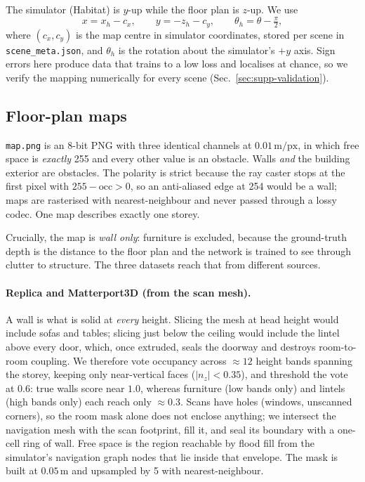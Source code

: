 The simulator (Habitat) is $y$-up while the floor plan is $z$-up. We use
\begin{equation}
  x = x_{h} - c_x, \qquad y = -z_{h} - c_y, \qquad \theta_{h} = \theta - \tfrac{\pi}{2},
\end{equation}
where $(c_x, c_y)$ is the map centre in simulator coordinates, stored per scene in
\texttt{scene\_meta.json}, and $\theta_h$ is the rotation about the simulator's
$+y$ axis. Sign errors here produce data that trains to a low loss and localises
at chance, so we verify the mapping numerically for every scene
(Sec.~\ref{sec:supp-validation}).

\subsection{Floor-plan maps}
\label{sec:supp-maps}

\texttt{map.png} is an 8-bit PNG with three identical channels at
$0.01\,\mathrm{m/px}$, in which free space is \emph{exactly} 255 and every other
value is an obstacle. Walls \emph{and} the building exterior are obstacles. The
polarity is strict because the ray caster stops at the first pixel with
$255 - \mathrm{occ} > 0$, so an anti-aliased edge at 254 would be a wall; maps are
rasterised with nearest-neighbour and never passed through a lossy codec. One map
describes exactly one storey.

Crucially, the map is \emph{wall only}: furniture is excluded, because the
ground-truth depth is the distance to the floor plan and the network is trained to
see through clutter to structure. The three datasets reach that from different
sources.

\paragraph{Replica and Matterport3D (from the scan mesh).}
A wall is what is solid at \emph{every} height. Slicing the mesh at head height
would include sofas and tables; slicing just below the ceiling would include the
lintel above every door, which, once extruded, seals the doorway and destroys
room-to-room coupling. We therefore vote occupancy across $\approx 12$ height bands
spanning the storey, keeping only near-vertical faces ($|n_z| < 0.35$), and
threshold the vote at $0.6$: true walls score near $1.0$, whereas furniture (low
bands only) and lintels (high bands only) each reach only $\approx 0.3$. Scans have
holes (windows, unscanned corners), so the room mask alone does not enclose
anything; we intersect the navigation mesh with the scan footprint, fill it, and
seal its boundary with a one-cell ring of wall. Free space is the region reachable
by flood fill from the simulator's navigation graph nodes that lie inside that
envelope. The mask is built at $0.05\,\mathrm{m}$ and upsampled by 5 with
nearest-neighbour.

